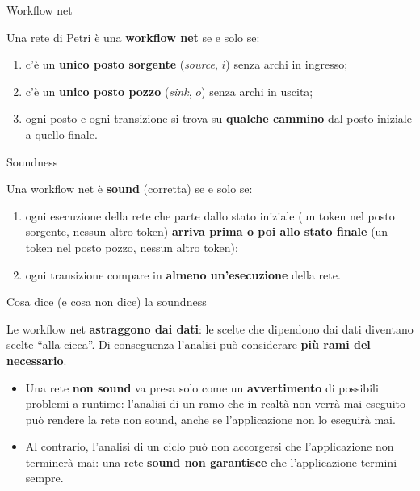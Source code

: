 \begin{boxdefinition}{Workflow net}

Una rete di Petri è una \textbf{workflow net} se e solo se:

\begin{enumerate}
\def\labelenumi{\arabic{enumi}.}
\tightlist
\item
  c'è un \textbf{unico posto sorgente} (\emph{source}, \(i\)) senza
  archi in ingresso;
\item
  c'è un \textbf{unico posto pozzo} (\emph{sink}, \(o\)) senza archi in
  uscita;
\item
  ogni posto e ogni transizione si trova su \textbf{qualche cammino} dal
  posto iniziale a quello finale.
\end{enumerate}

\end{boxdefinition}

\begin{boxdefinition}{Soundness}

Una workflow net è \textbf{sound} (corretta) se e solo se:

\begin{enumerate}
\def\labelenumi{\arabic{enumi}.}
\tightlist
\item
  ogni esecuzione della rete che parte dallo stato iniziale (un token
  nel posto sorgente, nessun altro token) \textbf{arriva prima o poi
  allo stato finale} (un token nel posto pozzo, nessun altro token);
\item
  ogni transizione compare in \textbf{almeno un'esecuzione} della rete.
\end{enumerate}

\end{boxdefinition}

\begin{boxwarning}{Cosa dice (e cosa non dice) la soundness}

Le workflow net \textbf{astraggono dai dati}: le scelte che dipendono
dai dati diventano scelte ``alla cieca''. Di conseguenza l'analisi può
considerare \textbf{più rami del necessario}.

\begin{itemize}
\tightlist
\item
  Una rete \textbf{non sound} va presa solo come un
  \textbf{avvertimento} di possibili problemi a runtime: l'analisi di un
  ramo che in realtà non verrà mai eseguito può rendere la rete non
  sound, anche se l'applicazione non lo eseguirà mai.
\item
  Al contrario, l'analisi di un ciclo può non accorgersi che
  l'applicazione non terminerà mai: una rete \textbf{sound non
  garantisce} che l'applicazione termini sempre.
\end{itemize}

\end{boxwarning}

